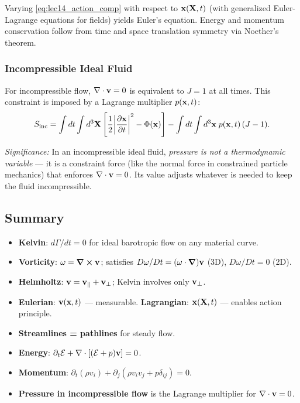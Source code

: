 \documentclass[../main.tex]{subfiles}
\begin{document}
Varying \eqref{eq:lec14_action_comp} with respect to $\mathbf{x}(\mathbf{X},t)$ (with generalized Euler-Lagrange equations for fields) yields Euler's equation. Energy and momentum conservation follow from time and space translation symmetry via Noether's theorem.

\subsubsection{Incompressible Ideal Fluid}

For incompressible flow, $\nabla \cdot\mathbf{v}=0$ is equivalent to $J=1$ at all times. This constraint is imposed by a Lagrange multiplier $p(\mathbf{x},t)$:
\begin{equation}
  S_{\rm inc} = \int dt \int d^3\mathbf{X}
    \left[\frac{1}{2}\!\left|\pdv{\mathbf{x}}{t}\right|^2 - \Phi(\mathbf{x})\right]
    -\int dt \int d^3\mathbf{x}\; p(\mathbf{x},t)\,(J-1).
  \label{eq:lec14_action_inc}
\end{equation}

\textit{Significance:} In an incompressible ideal fluid, \emph{pressure is not a thermodynamic variable} — it is a constraint force (like the normal force in constrained particle mechanics) that enforces $\nabla \cdot\mathbf{v}=0$. Its value adjusts whatever is needed to keep the fluid incompressible.

\subsection*{Summary}

\begin{itemize}
  \item \textbf{Kelvin}: $d\Gamma/dt=0$ for ideal barotropic flow on any material curve.
  \item \textbf{Vorticity}: $\mathbf{\omega}=\curl\mathbf{v}$; satisfies $D\mathbf{\omega}/Dt=(\mathbf{\omega}\cdot\grad)\mathbf{v}$ (3D), $D\omega/Dt=0$ (2D).
  \item \textbf{Helmholtz}: $\mathbf{v}=\mathbf{v}_\parallel+\mathbf{v}_\perp$; Kelvin involves only $\mathbf{v}_\perp$.
  \item \textbf{Eulerian}: $\mathbf{v}(\mathbf{x},t)$ — measurable. \textbf{Lagrangian}: $\mathbf{x}(\mathbf{X},t)$ — enables action principle.
  \item \textbf{Streamlines = pathlines} for steady flow.
  \item \textbf{Energy}: $\partial_t\mathcal{E}+\nabla \cdot[(\mathcal{E}+p)\mathbf{v}]=0$.
  \item \textbf{Momentum}: $\partial_t(\rho v_i)+\partial_j(\rho v_i v_j+p\delta_{ij})=0$.
  \item \textbf{Pressure in incompressible flow} is the Lagrange multiplier for $\nabla \cdot\mathbf{v}=0$.
\end{itemize}
\end{document}
